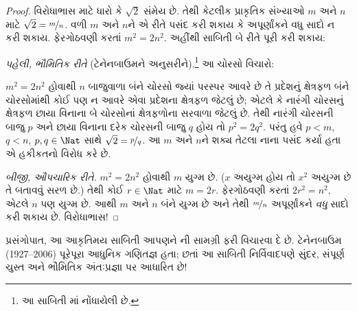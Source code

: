\documentclass[../../../include/open-logic-section]{subfiles}
\begin{document}
\begin{proof}
વિરોધાભાસ માટે ધારો કે $\sqrt{2}$ સંમેય છે. તેથી કેટલીક પ્રાકૃતિક
સંખ્યાઓ $m$ અને $n$ માટે $\sqrt{2} = \nicefrac{m}{n}$. વળી $m$ અને
$n$ને એ રીતે પસંદ કરી શકાય કે અપૂર્ણાંકને વધુ સાદો ન કરી શકાય.
ફેરગોઠવણી કરતાં $m^{2} = 2n^{2}$. અહીંથી સાબિતી બે રીતે પૂરી કરી શકાય:

\emph{પહેલી, ભૌમિતિક રીતે} (ટેનેનબાઉમને અનુસરીને).\footnote{આ સાબિતી
\cite{Conway2006}માં નોંધાયેલી છે.} આ ચોરસો વિચારો:
\begin{center}
\end{center}
$m^2 = 2n^2$ હોવાથી $n$ બાજુવાળા બંને ચોરસો જ્યાં પરસ્પર આવરે છે
તે પ્રદેશનું ક્ષેત્રફળ બંને ચોરસોમાંથી કોઈ પણ ન આવરે એવા પ્રદેશના
ક્ષેત્રફળ જેટલું છે; એટલે કે નારંગી ચોરસનું ક્ષેત્રફળ છાયા વિનાના બે
ચોરસોનાં ક્ષેત્રફળોના સરવાળા જેટલું છે. તેથી નારંગી ચોરસની બાજુ $p$
અને છાયા વિનાના દરેક ચોરસની બાજુ $q$ હોય તો $p^2 = 2q^2$. પરંતુ હવે
$p < m$, $q < n$, $p, q \in \Nat$ સાથે
$\sqrt{2} = \nicefrac{p}{q}$. આ $m$ અને $n$ને શક્ય તેટલા નાના પસંદ
કર્યા હતા એ હકીકતનો વિરોધ કરે છે.

\emph{બીજી, ઔપચારિક રીતે.} $m^{2} = 2n^{2}$ હોવાથી $m$ યુગ્મ છે.
($x$ અયુગ્મ હોય તો $x^2$ અયુગ્મ છે તે બતાવવું સરળ છે.) તેથી કોઈ
$r \in \Nat$ માટે $m = 2r$. ફેરગોઠવણી કરતાં $2r^2 = n^2$,
એટલે $n$ પણ યુગ્મ છે. આથી $m$ અને $n$ બંને યુગ્મ છે અને તેથી
$\nicefrac{m}{n}$ અપૂર્ણાંકને \emph{વધુ} સાદો કરી શકાય છે.
વિરોધાભાસ!
\end{proof}

પ્રસંગોપાત, આ આકૃતિમય સાબિતી આપણને ની
સામગ્રી ફરી વિચારવા દે છે. ટેનેનબાઉમ (1927--2006) પૂરેપૂરા આધુનિક
ગણિતજ્ઞ હતા; છતાં આ સાબિતી નિર્વિવાદપણે સુંદર, સંપૂર્ણ ચુસ્ત અને
ભૌમિતિક અંતઃપ્રજ્ઞા પર આધારિત છે!
\end{document}
